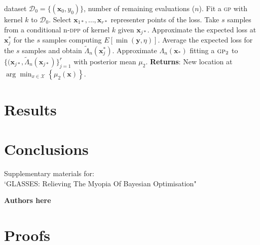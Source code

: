\documentclass[twoside]{article}
\newcommand{\bx}{\textbf{x}}
\newcommand{\by}{\textbf{y}}
\newcommand{\acr}[1]{\textsc{#1}\xspace}
\newcommand{\gp}{\acr{gp}}
\newcommand{\dpp}{\acr{dpp}}
\newcommand{\us}{\acr{glasses}}
\begin{document}
\begin{algorithm*}[t!]
   \caption{Decision process of the \us algorithm.}
   \label{alg:glasses}
\begin{algorithmic}
    dataset $\mathcal{D}_{0} = \{(\textbf{x}_0, y_0)\}$, number of remaining evaluations ($n$).
   \STATE Fit a \gp with kernel $k$ to $\mathcal{D}_{0}$.
   \STATE Select $\bx_{1*},\dots,\bx_{r*}$ representer points of the loss.
   \STATE Take $s$ samples from a conditional n-\dpp of kernel $k$ given $\bx_{j*}$.
   \STATE Approximate the expected loss at $\bx_j^*$ for the $s$ samples computing $E [\min (\by,\eta)]$.
  \STATE Average the expected loss for the $s$ samples and obtain $\tilde{\Lambda}_n(\bx_j^*)$.
   \ENDFOR
\STATE Approximate $\Lambda_n(\bx_*)$ fitting a $\gp_2$  to $\{(\bx_{j*}, \tilde{\Lambda}_n(\bx_{j*})\}_{j=1}^r$ with posterior mean $\mu_2$.
   \STATE \textbf{Returns}: New location at $\arg \min_{x \in \mathcal{X}} \left\{\mu_2(\bx)\right\}$.  
\end{algorithmic}
\end{algorithm*}

\section{Results}


\section{Conclusions}




\clearpage
\setcounter{section}{0}
\setcounter{equation}{0}
\renewcommand{\thesection}{S\arabic{section}}
\renewcommand{\theequation}{S.\arabic{equation}}

\begin{center}
{\LARGE  Supplementary materials for:\\
`GLASSES: Relieving The Myopia Of Bayesian Optimisation"}
\end{center}
\begin{center}
\textbf{Authors here}
\end{center}

\section{Proofs}
\end{document}
